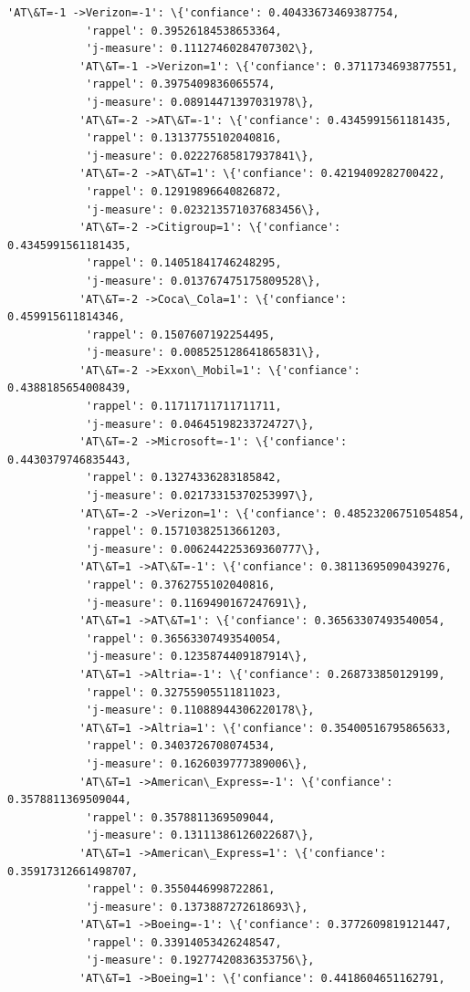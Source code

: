 \documentclass[11pt]{article}
\begin{document}
\begin{Verbatim}[commandchars=\\\{\}]
           'AT\&T=-1 ->Verizon=-1': \{'confiance': 0.40433673469387754,
            'rappel': 0.39526184538653364,
            'j-measure': 0.11127460284707302\},
           'AT\&T=-1 ->Verizon=1': \{'confiance': 0.3711734693877551,
            'rappel': 0.3975409836065574,
            'j-measure': 0.08914471397031978\},
           'AT\&T=-2 ->AT\&T=-1': \{'confiance': 0.4345991561181435,
            'rappel': 0.13137755102040816,
            'j-measure': 0.02227685817937841\},
           'AT\&T=-2 ->AT\&T=1': \{'confiance': 0.4219409282700422,
            'rappel': 0.12919896640826872,
            'j-measure': 0.023213571037683456\},
           'AT\&T=-2 ->Citigroup=1': \{'confiance': 0.4345991561181435,
            'rappel': 0.14051841746248295,
            'j-measure': 0.013767475175809528\},
           'AT\&T=-2 ->Coca\_Cola=1': \{'confiance': 0.459915611814346,
            'rappel': 0.1507607192254495,
            'j-measure': 0.008525128641865831\},
           'AT\&T=-2 ->Exxon\_Mobil=1': \{'confiance': 0.4388185654008439,
            'rappel': 0.11711711711711711,
            'j-measure': 0.04645198233724727\},
           'AT\&T=-2 ->Microsoft=-1': \{'confiance': 0.4430379746835443,
            'rappel': 0.13274336283185842,
            'j-measure': 0.02173315370253997\},
           'AT\&T=-2 ->Verizon=1': \{'confiance': 0.48523206751054854,
            'rappel': 0.15710382513661203,
            'j-measure': 0.006244225369360777\},
           'AT\&T=1 ->AT\&T=-1': \{'confiance': 0.38113695090439276,
            'rappel': 0.3762755102040816,
            'j-measure': 0.1169490167247691\},
           'AT\&T=1 ->AT\&T=1': \{'confiance': 0.36563307493540054,
            'rappel': 0.36563307493540054,
            'j-measure': 0.1235874409187914\},
           'AT\&T=1 ->Altria=-1': \{'confiance': 0.268733850129199,
            'rappel': 0.32755905511811023,
            'j-measure': 0.11088944306220178\},
           'AT\&T=1 ->Altria=1': \{'confiance': 0.35400516795865633,
            'rappel': 0.3403726708074534,
            'j-measure': 0.1626039777389006\},
           'AT\&T=1 ->American\_Express=-1': \{'confiance': 0.3578811369509044,
            'rappel': 0.3578811369509044,
            'j-measure': 0.13111386126022687\},
           'AT\&T=1 ->American\_Express=1': \{'confiance': 0.35917312661498707,
            'rappel': 0.3550446998722861,
            'j-measure': 0.1373887272618693\},
           'AT\&T=1 ->Boeing=-1': \{'confiance': 0.3772609819121447,
            'rappel': 0.33914053426248547,
            'j-measure': 0.19277420836353756\},
           'AT\&T=1 ->Boeing=1': \{'confiance': 0.4418604651162791,

\end{Verbatim}
\end{document}
